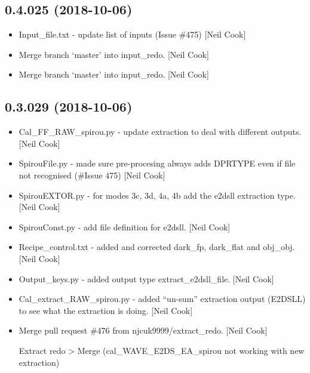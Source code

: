\documentclass[a4paper,10pt,english]{report}
\begin{document}
\subsection{0.4.025 (2018-10-06)}
\label{\detokenize{misc/changelog:id300}}\begin{itemize}
\item {} 
Input\_file.txt - update list of inputs (Issue \#475) {[}Neil Cook{]}

\item {} 
Merge branch ‘master’ into input\_redo. {[}Neil Cook{]}

\item {} 
Merge branch ‘master’ into input\_redo. {[}Neil Cook{]}

\end{itemize}


\subsection{0.3.029 (2018-10-06)}
\label{\detokenize{misc/changelog:id301}}\begin{itemize}
\item {} 
Cal\_FF\_RAW\_spirou.py - update extraction to deal with different
outputs. {[}Neil Cook{]}

\item {} 
SpirouFile.py - made sure pre-procesing always adds DPRTYPE even if
file not recognised (\#Issue 475) {[}Neil Cook{]}

\item {} 
SpirouEXTOR.py - for modes 3c, 3d, 4a, 4b add the e2dsll extraction
type. {[}Neil Cook{]}

\item {} 
SpirouConst.py - add file definition for e2dsll. {[}Neil Cook{]}

\item {} 
Recipe\_control.txt - added and corrected dark\_fp, dark\_flat and
obj\_obj. {[}Neil Cook{]}

\item {} 
Output\_keys.py - added output type extract\_e2dsll\_file. {[}Neil Cook{]}

\item {} 
Cal\_extract\_RAW\_spirou.py - added “un-sum” extraction output (E2DSLL)
to see what the extraction is doing. {[}Neil Cook{]}

\item {} 
Merge pull request \#476 from njcuk9999/extract\_redo. {[}Neil Cook{]}

Extract redo \textendash{}\textgreater{} Merge (cal\_WAVE\_E2DS\_EA\_spirou not working with new extraction)

\end{itemize}
\end{document}
